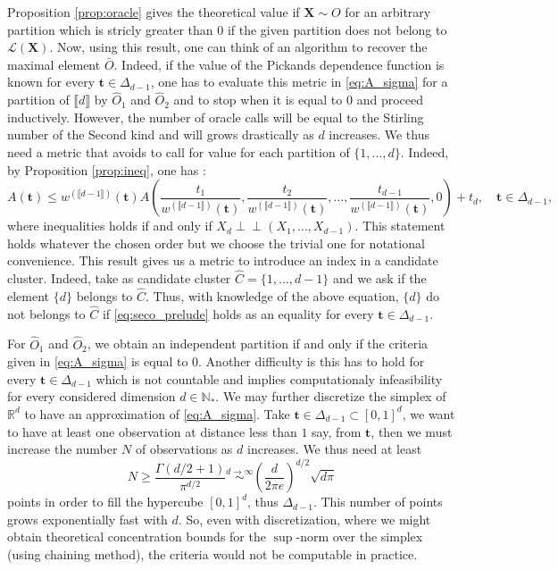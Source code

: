 \documentclass[11pt]{article}
\newcommand{\indep}{\perp \!\!\! \perp}
\begin{document}
	Proposition \ref{prop:oracle} gives the theoretical value if $\textbf{X} \sim O$ for an arbitrary partition which is stricly greater than $0$ if the given partition does not belong to $\mathcal{L}(\textbf{X})$. Now, using this result, one can think of an algorithm to recover the maximal element $\bar{O}$. Indeed, if the value of the Pickands dependence function is known for every $\textbf{t} \in \Delta_{d-1}$, one has to evaluate this metric in \eqref{eq:A_sigma} for a partition of $\llbracket d \rrbracket$ by $\hat{O}_1$ and $\hat{O}_2$ and to stop when it is equal to $0$ and proceed inductively. However, the number of oracle calls will be equal to the Stirling number of the Second kind and will grows drastically as $d$ increases. We thus need a metric that avoids to call for value for each partition of $\{1,\dots,d\}$. Indeed, by Proposition \ref{prop:ineq}, one has :
	\begin{equation}
		\label{eq:seco_prelude}
		A(\textbf{t}) \leq w^{(\llbracket d-1 \rrbracket)}(\textbf{t}) A\left(\frac{t_1}{w^{(\llbracket d-1 \rrbracket)}(\textbf{t})}, \frac{t_2}{w^{(\llbracket d-1 \rrbracket)}(\textbf{t})} ,\dots, \frac{t_{d-1}}{w^{(\llbracket d-1 \rrbracket)}(\textbf{t})}, 0\right) + t_d , \quad \textbf{t} \in \Delta_{d-1},
	\end{equation}
	where inequalities holds if and only if $X_d \indep (X_1,\dots, X_{d-1})$. This statement holds whatever the chosen order but we choose the trivial one for notational convenience. This result gives us a metric to introduce an index in a candidate cluster. Indeed, take as candidate cluster $\hat{C} = \{1,\dots,d-1\}$ and we ask if the element $\{d\}$ belongs to $\hat{C}$. Thus, with knowledge of the above equation, $\{d\}$ do not belongs to $\hat{C}$ if \eqref{eq:seco_prelude} holds as an equality for every $\textbf{t} \in \Delta_{d-1}$.
	
	For $\hat{O}_1$ and $\hat{O}_2$, we obtain an independent partition if and only if the criteria given in \eqref{eq:A_sigma} is equal to $0$. Another difficulty is this has to hold for every $\textbf{t} \in \Delta_{d-1}$ which is not countable and implies computationaly infeasibility for every considered dimension $d \in \mathbb{N}_*$. We may further discretize the simplex of $\mathbb{R}^d$ to have an approximation of \eqref{eq:A_sigma}. Take $\textbf{t} \in \Delta_{d-1} \subset [0,1]^d$, we want to have at least one observation at distance less than $1$ say, from $\textbf{t}$, then we must increase the number $N$ of observations as $d$ increases. We thus need at least
	\begin{equation*}
	N \geq \frac{\Gamma(d/2 + 1)}{\pi^{d/2}} \overset{d \rightarrow \infty}{\sim} \left( \frac{d}{2 \pi e} \right)^{d/2} \sqrt{d \pi}
	\end{equation*}
	points in order to fill the hypercube $[0,1]^d$, thus $\Delta_{d-1}$. This number of points grows exponentially fast with $d$. So, even with discretization, where we might obtain theoretical concentration bounds for the $\sup$-norm over the simplex (using chaining method), the criteria would not be computable in practice.
	
\end{document}
